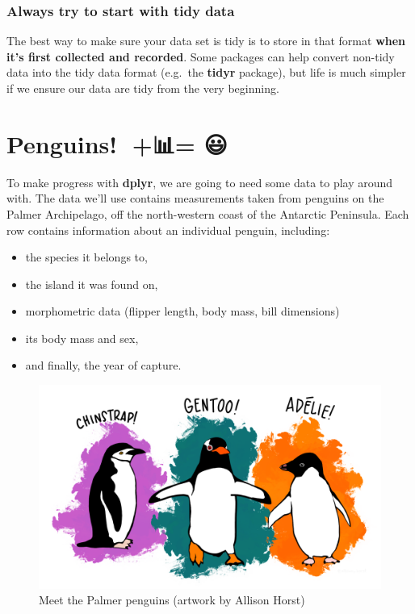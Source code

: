 \documentclass[
]{book}
\providecommand{\tightlist}{%
  \setlength{\itemsep}{0pt}\setlength{\parskip}{0pt}}
\newenvironment{greybox}{
  \definecolor{shadecolor}{rgb}{0.95,0.95,0.95}  %
  \color{black}
  \begin{shaded}}
 {\end{shaded}}
\newenvironment{infobox}[1]
  {
  \begin{itemize}
  \renewcommand{\labelitemi}{
    \raisebox{-.7\height}[0pt][0pt]{
      {\setkeys{Gin}{width=3em,keepaspectratio}
        \texttt{[image: images/\#1]}}
    }
  }
  \setlength{\fboxsep}{1em}
  \begin{greybox}
  \item
  }
  {
  \end{greybox}
  \end{itemize}
  }
\begin{document}
\begin{infobox}{warning}

\hypertarget{always-try-to-start-with-tidy-data}{%
\subsubsection*{Always try to start with tidy data}\label{always-try-to-start-with-tidy-data}}

The best way to make sure your data set is tidy is to store in that format \textbf{when it's first collected and recorded}. Some packages can help convert non-tidy data into the tidy data format (e.g.~the \textbf{tidyr} package), but life is much simpler if we ensure our data are tidy from the very beginning.

\end{infobox}

\hypertarget{penguins-data-overview}{%
\section{Penguins! 🐧+📊= 😃}\label{penguins-data-overview}}

To make progress with \textbf{dplyr}, we are going to need some data to play around with. The data we'll use contains measurements taken from penguins on the Palmer Archipelago, off the north-western coast of the Antarctic Peninsula. Each row contains information about an individual penguin, including:

\begin{itemize}
\tightlist
\item
  the species it belongs to,
\item
  the island it was found on,
\item
  morphometric data (flipper length, body mass, bill dimensions)
\item
  its body mass and sex,
\item
  and finally, the year of capture.
\end{itemize}

\begin{figure}

{\centering \includegraphics[width=0.75\linewidth]{./images/lter_penguins} 

}

\caption{Meet the Palmer penguins (artwork by Allison Horst)}\label{fig:unnamed-chunk-101}
\end{figure}
\end{document}
